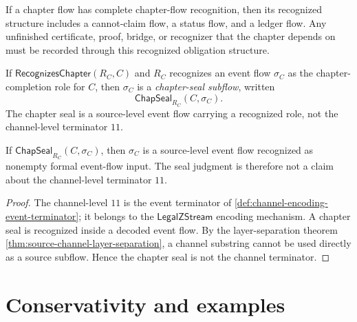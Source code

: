 \begin{corollary}
\label{cor:chapter-generated-open-obligations-recorded}
If a chapter flow has complete chapter-flow recognition, then its recognized structure includes a cannot-claim flow, a status flow, and a ledger flow. Any unfinished certificate, proof, bridge, or recognizer that the chapter depends on must be recorded through this recognized obligation structure.
\end{corollary}

\begin{definition}
\label{def:chapter-generated-seal-subflow}
If $\mathsf{RecognizesChapter}(R_C,C)$ and $R_C$ recognizes an event flow $\sigma_C$ as the chapter-completion role for $C$, then $\sigma_C$ is a \emph{chapter-seal subflow}, written
$$
  \mathsf{ChapSeal}_{R_C}(C,\sigma_C).
$$
The chapter seal is a source-level event flow carrying a recognized role, not the channel-level terminator $11$.
\end{definition}

\begin{proposition}
\label{prop:chapter-generated-seal-not-channel-terminator}
If $\mathsf{ChapSeal}_{R_C}(C,\sigma_C)$, then $\sigma_C$ is a source-level event flow recognized as nonempty formal event-flow input. The seal judgment is therefore not a claim about the channel-level terminator $11$.
\end{proposition}

\begin{proof}
The channel-level $11$ is the event terminator of \autoref{def:channel-encoding-event-terminator}; it belongs to the $\mathsf{LegalZStream}$ encoding mechanism. A chapter seal is recognized inside a decoded event flow. By the layer-separation theorem \autoref{thm:source-channel-layer-separation}, a channel substring cannot be used directly as a source subflow. Hence the chapter seal is not the channel terminator.
\end{proof}

\section{Conservativity and examples}
\label{sec:chapter-generated-conservativity-examples}

